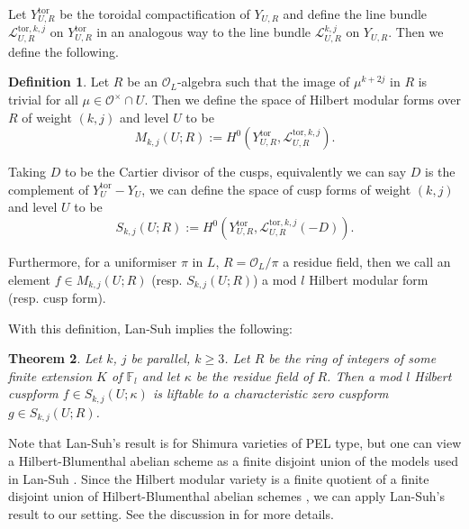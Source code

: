 \documentclass[a4paper,oneside]{amsart}
\theoremstyle{plain}
\newtheorem{thm}{Theorem}[section]
\theoremstyle{definition}
\newtheorem{define}[thm]{Definition}
\begin{document}
Let $Y_{U,R}^\text{tor}$ be the toroidal compactification of $Y_{U,R}$ and define the line bundle $\mathcal{L}_{U,R}^{\text{tor}, k,j}$ on $Y_{U,R}^\text{tor}$ in an analogous way to the line bundle $\mathcal{L}_{U,R}^{k,j} $ on $Y_{U,R}$. Then we define the following.

\begin{define}
    Let $R$ be an $\mathcal{O}_L$-algebra such that the image of $\mu^{k +2j}$ in $R$ is trivial for all $\mu \in \mathcal{O}^\times \cap U$. Then we define the space of Hilbert modular forms over $R$ of weight $(k,j)$ and level $U$ to be 
    \begin{equation*}
        M_{k,j}(U;R) := H^0(Y_{U,R}^\text{tor}, \mathcal{L}_{U,R}^{\text{tor},k,j}).
    \end{equation*}

    Taking $D$ to be the Cartier divisor of the cusps, equivalently we can say $D$ is the complement of $Y^\text{tor}_{U} - Y_{U}$, we can define the space of cusp forms of weight $(k,j)$ and level $U$ to be
    \begin{equation*}
        S_{k,j}(U;R) := H^0(Y_{U,R}^\text{tor}, \mathcal{L}_{U,R}^{\text{tor},k,j}(-D)).
    \end{equation*}

    Furthermore, for a uniformiser $\pi$ in $L$, $R= \mathcal{O}_L/\pi$ a residue field, then we call an element $f \in M_{k,j}(U;R)$ (resp. $S_{k,j}(U;R)$) a mod $l$ Hilbert modular form (resp. cusp form).
\end{define}
With this definition, Lan-Suh \cite[Thm. 4.1]{lansuh} implies the following:
\begin{thm}
\label{thm:lift}
    Let $k$, $j$ be parallel, $k \geq 3$. Let $R$ be the ring of integers of some finite extension $K$ of $\mathbb{F}_l$ and let $\kappa$ be the residue field of $R$. Then a mod $l$ Hilbert cuspform $f \in S_{k,j}(U;\kappa)$ is liftable to a characteristic zero cuspform $g \in S_{k,j}(U;R)$.
\end{thm}

Note that Lan-Suh's result is for Shimura varieties of PEL type, but one can view a Hilbert-Blumenthal abelian scheme as a finite disjoint union of the models used in Lan-Suh \cite{lansuh}. Since the Hilbert modular variety is a finite quotient of a finite disjoint union of Hilbert-Blumenthal abelian schemes \cite[\S 2.1.3]{diamondkassaeisasaki}, we can apply Lan-Suh's result to our setting. See the discussion in \cite[\S 2.4]{diamond} for more details.
\end{document}

